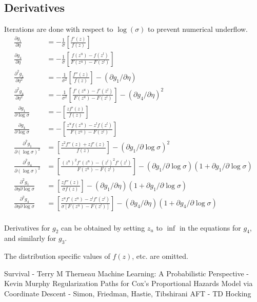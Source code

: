 \documentclass[12pt,a4paper]{report}
\begin{document}
\subsection*{Derivatives}
Iterations are done with respect to $\log(\sigma)$ to prevent numerical underflow.
\begin{equation}
\begin{split}
\frac{\partial g_1}{\partial \eta} & = - \frac{1}{\sigma} \left [ \frac{f'(z)}{f(z)} \right ] \\
\frac{\partial g_4}{\partial \eta} & = - \frac{1}{\sigma} \left [ \frac{f(z^u) - f(z^l)} {F(z^u) - F(z^l)} \right ] \\
\frac{\partial^2 g_1}{\partial \eta^2} & = - \frac{1}{\sigma^2} \left [ \frac{f''(z)}{f(z)} \right ] - \left ({\partial g_1}/{\partial \eta} \right ) \\
\frac{\partial^2 g_4}{\partial \eta^2} & = - \frac{1}{\sigma^2} \left [ \frac{f'(z^u) - f'(z^l)} {F(z^u) - F(z^l)} \right ] - \left ({\partial g_4}/{\partial \eta} \right )^2 \\
\frac{\partial g_1}{\partial \log \sigma} & = - \left [ \frac{z f'(z)}{f(z)} \right ] \\
\frac{\partial g_4}{\partial \log \sigma} & = - \left [ \frac{z^u f(z^u) - z^l f(z^l)} {F(z^u) - F(z^l)} \right ] \\
\frac{\partial^2 g_1}{\partial (\log \sigma )^2} & = \left [ \frac{z^2 f''(z) + z f'(z)}{f(z)} \right ] - \left ({\partial g_1}/{\partial \log \sigma } \right )^2 \\
\frac{\partial^2 g_4}{\partial (\log \sigma )^2} & = \left [ \frac{(z^u )^2 f'(z^u) - (z^l )^2 f'(z^l)} {F(z^u) - F(z^l)} \right ] - (\partial g_1 / \partial \log \sigma) (1 + \partial g_1 / \partial \log \sigma ) \\
\frac{\partial^2 g_1}{\partial \eta \partial \log \sigma} & = \left [\frac{z f''(z)} {\sigma f(z)} \right ] - (\partial g_1 / \partial \eta) (1 + \partial g_1 / \partial \log \sigma ) \\
\frac{\partial^2 g_4}{\partial \eta \partial \log \sigma} & = \left [\frac{z^u f'(z^u ) - z^l f'(z^l)} {\sigma [F(z^u) - F(z^l)]} \right ] - (\partial g_4 / \partial \eta) (1 + \partial g_4 / \partial \log \sigma ) \\
\end{split}  		%
\end{equation}

Derivatives for $g_2$ can be obtained by setting $z_u$ to $\inf$ in the equations for $g_4$, and similarly for $g_3$.

The distribution specific values of $f(z)$, etc. are omitted.

\begin{thebibliography}{1}
 Survival - Terry M Therneau
 Machine Learning: A Probabilistic Perspective - Kevin Murphy
 Regularization Paths for Cox's Proportional Hazards Model via Coordinate Descent - Simon, Friedman, Hastie, Tibshirani
 AFT - TD Hocking
\end{thebibliography}
\end{document}
